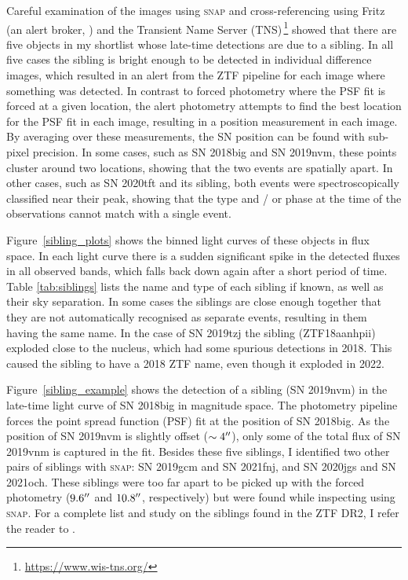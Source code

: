 \documentclass[a4paper,oneside,12pt, class=Latex/Classes/PhDthesisPSnPDF, crop=false]{standalone}
\begin{document}
Careful examination of the images using \textsc{snap} and cross-referencing using Fritz (an alert broker, \citealt{skyportal2019, duev2019realbogus, Kasliwal2019, Skyportal}) and the Transient Name Server (TNS)\,\footnote{\url{https://www.wis-tns.org/}} showed that there are five objects in my shortlist whose late-time detections are due to a sibling. In all five cases the sibling is bright enough to be detected in individual difference images, which resulted in an alert from the ZTF pipeline for each image where something was detected. In contrast to forced photometry where the PSF fit is forced at a given location, the alert photometry attempts to find the best location for the PSF fit in each image, resulting in a position measurement in each image. By averaging over these measurements, the SN position can be found with sub-pixel precision. In some cases, such as SN 2018big and SN 2019nvm, these points cluster around two locations, showing that the two events are spatially apart. In other cases, such as SN 2020tft and its sibling, both events were spectroscopically classified near their peak, showing that the type and / or phase at the time of the observations cannot match with a single event.

Figure~\ref{sibling_plots} shows the binned light curves of these objects in flux space. In each light curve there is a sudden significant spike in the detected fluxes in all observed bands, which falls back down again after a short period of time. Table \ref{tab:siblings} lists the name and type of each sibling if known, as well as their sky separation. In some cases the siblings are close enough together that they are not automatically recognised as separate events, resulting in them having the same name. In the case of SN 2019tzj the sibling (ZTF18aanhpii) exploded close to the nucleus, which had some spurious detections in 2018. This caused the sibling to have a 2018 ZTF name, even though it exploded in 2022.

Figure~\ref{sibling_example} shows the detection of a sibling (SN 2019nvm) in the late-time light curve of SN 2018big in magnitude space. The photometry pipeline forces the point spread function (PSF) fit at the position of SN 2018big. As the position of SN 2019nvm is slightly offset ($\sim4^{\prime\prime}$), only some of the total flux of SN 2019vnm is captured in the fit. Besides these five siblings, I identified two other pairs of siblings with \textsc{snap}: SN 2019gcm and SN 2021fnj, and SN 2020jgs and SN 2021och. These siblings were too far apart to be picked up with the forced photometry ($9.6^{\prime\prime}$ and $10.8^{\prime\prime}$, respectively) but were found while inspecting using \textsc{snap}. For a complete list and study on the siblings found in the ZTF DR2, I refer the reader to \citet{DR2_siblings}.
\end{document}
